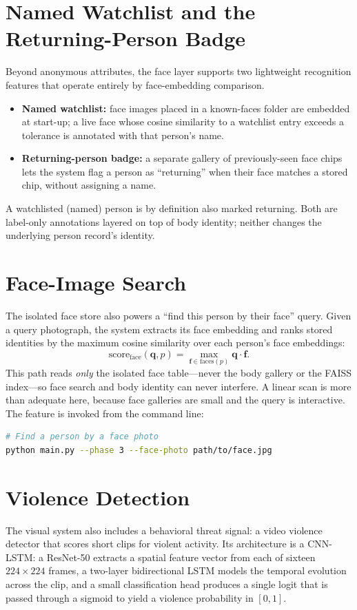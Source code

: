 \documentclass[12pt]{report}
\begin{document}
\section{Named Watchlist and the Returning-Person Badge}
Beyond anonymous attributes, the face layer supports two lightweight recognition features that operate entirely by face-embedding comparison.
\begin{itemize}
    \item \textbf{Named watchlist:} face images placed in a known-faces folder are embedded at start-up; a live face whose cosine similarity to a watchlist entry exceeds a tolerance is annotated with that person's name.
    \item \textbf{Returning-person badge:} a separate gallery of previously-seen face chips lets the system flag a person as ``returning'' when their face matches a stored chip, without assigning a name.
\end{itemize}
A watchlisted (named) person is by definition also marked returning. Both are label-only annotations layered on top of body identity; neither changes the underlying person record's identity.

\section{Face-Image Search}
The isolated face store also powers a ``find this person by their face'' query. Given a query photograph, the system extracts its face embedding and ranks stored identities by the maximum cosine similarity over each person's face embeddings:
\[
\text{score}_{\text{face}}(\mathbf{q}, p) = \max_{\mathbf{f} \in \text{faces}(p)} \mathbf{q} \cdot \mathbf{f} .
\]
This path reads \emph{only} the isolated face table---never the body gallery or the FAISS index---so face search and body identity can never interfere. A linear scan is more than adequate here, because face galleries are small and the query is interactive. The feature is invoked from the command line:
\begin{lstlisting}[language=bash]
# Find a person by a face photo
python main.py --phase 3 --face-photo path/to/face.jpg
\end{lstlisting}

\section{Violence Detection}
The visual system also includes a behavioral threat signal: a video violence detector that scores short clips for violent activity. Its architecture is a CNN-LSTM: a ResNet-50 extracts a spatial feature vector from each of sixteen $224 \times 224$ frames, a two-layer bidirectional LSTM models the temporal evolution across the clip, and a small classification head produces a single logit that is passed through a sigmoid to yield a violence probability in $[0,1]$.
\end{document}
